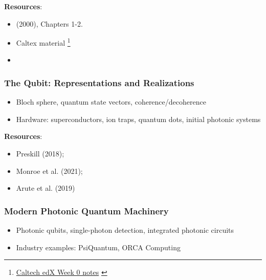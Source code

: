 \textbf{Resources}:

\begin{itemize}
	\item \citeauthor{Nielsen:2000} (2000), Chapters 1-2.
	\item Caltex material \footnote{\href{http://users.cms.caltech.edu/~vidick/teaching/120_qcrypto/LN_Week0.pdf}{Caltech edX Week 0 notes} \label{caltech:edX:week0}} %
	\item {}
\end{itemize}


\subsubsection{The Qubit: Representations and Realizations}

\begin{itemize}
	\item Bloch sphere, quantum state vectors, coherence/decoherence
	
	\item Hardware: superconductors, ion traps, quantum dots, initial photonic systems
\end{itemize}

\textbf{Resources}:

\begin{itemize}
	\item Preskill (2018); 

	\item Monroe et al. (2021); 

	\item Arute et al. (2019)
\end{itemize}


\subsubsection{Modern Photonic Quantum Machinery}

\begin{itemize}
	\item Photonic qubits, single-photon detection, integrated photonic circuits
	
	\item Industry examples: PsiQuantum, ORCA Computing
\end{itemize}

